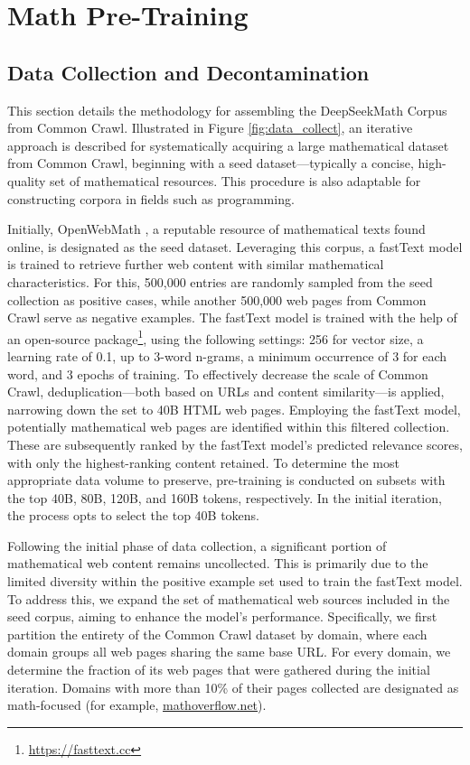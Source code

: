 \section{Math Pre-Training}

\subsection{Data Collection and Decontamination} 
This section details the methodology for assembling the DeepSeekMath Corpus from Common Crawl. Illustrated in Figure \ref{fig:data_collect}, an iterative approach is described for systematically acquiring a large mathematical dataset from Common Crawl, beginning with a seed dataset—typically a concise, high-quality set of mathematical resources. This procedure is also adaptable for constructing corpora in fields such as programming.

Initially, OpenWebMath \citep{openwebmath}, a reputable resource of mathematical texts found online, is designated as the seed dataset. Leveraging this corpus, a fastText model \citep{joulin2016fasttext} is trained to retrieve further web content with similar mathematical characteristics. For this, 500,000 entries are randomly sampled from the seed collection as positive cases, while another 500,000 web pages from Common Crawl serve as negative examples. The fastText model is trained with the help of an open-source package\footnote{\url{https://fasttext.cc}}, using the following settings: 256 for vector size, a learning rate of 0.1, up to 3-word n-grams, a minimum occurrence of 3 for each word, and 3 epochs of training. To effectively decrease the scale of Common Crawl, deduplication—both based on URLs and content similarity—is applied, narrowing down the set to 40B HTML web pages. Employing the fastText model, potentially mathematical web pages are identified within this filtered collection. These are subsequently ranked by the fastText model’s predicted relevance scores, with only the highest-ranking content retained. To determine the most appropriate data volume to preserve, pre-training is conducted on subsets with the top 40B, 80B, 120B, and 160B tokens, respectively. In the initial iteration, the process opts to select the top 40B tokens.

Following the initial phase of data collection, a significant portion of mathematical web content remains uncollected. This is primarily due to the limited diversity within the positive example set used to train the fastText model. To address this, we expand the set of mathematical web sources included in the seed corpus, aiming to enhance the model’s performance. Specifically, we first partition the entirety of the Common Crawl dataset by domain, where each domain groups all web pages sharing the same base URL. For every domain, we determine the fraction of its web pages that were gathered during the initial iteration. Domains with more than 10\% of their pages collected are designated as math-focused (for example, \url{mathoverflow.net}).


